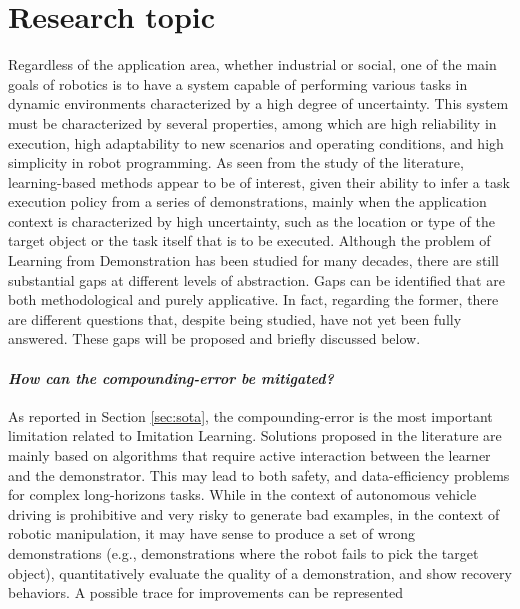 \section{Research topic}
\label{sec:research_topic}
Regardless of the application area, whether industrial or social, one of the main goals of robotics is to have a system capable of performing various tasks in dynamic environments characterized by a high degree of uncertainty. This system must be characterized by several properties, among which are high reliability in execution, high adaptability to new scenarios and operating conditions, and high simplicity in robot programming. As seen from the study of the literature, learning-based methods appear to be of interest, given their ability to infer a task execution policy from a series of demonstrations, mainly when the application context is characterized by high uncertainty, such as the location or type of the target object or the task itself that is to be executed. Although the problem of Learning from Demonstration has been studied for many decades, there are still substantial gaps at different levels of abstraction. Gaps can be identified that are both methodological and purely applicative. In fact, regarding the former, there are different questions that, despite being studied, have not yet been fully answered. These gaps will be proposed and briefly discussed below.

\paragraph{\textit{How can the compounding-error be mitigated?}} As reported in Section \ref{sec:sota}, the compounding-error is the most important limitation related to Imitation Learning. Solutions proposed in the literature are mainly based on algorithms that require active interaction between the learner and the demonstrator. This may lead to both safety, and data-efficiency problems for complex long-horizons tasks. While in the context of autonomous vehicle driving is prohibitive and very risky to generate bad examples, in the context of robotic manipulation, it may have sense to produce a set of wrong demonstrations (e.g., demonstrations where the robot fails to pick the target object), quantitatively evaluate the quality of a demonstration, and show recovery behaviors. A possible trace for improvements can be represented  

